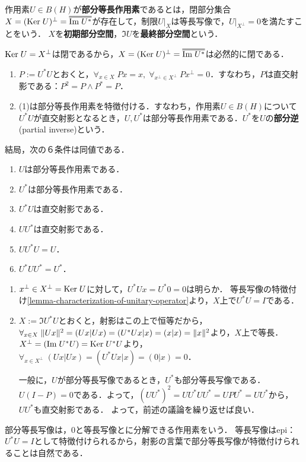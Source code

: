 \documentclass[uplatex,dvipdfmx]{jsreport}
\begin{document}
\begin{definition}
    作用素$U\in B(H)$が\textbf{部分等長作用素}であるとは，閉部分集合$X=(\Ker U)^\perp=\oo{\Im U^*}$が存在して，制限$U|_X$は等長写像で，$U|_{X^\perp}=0$を満たすことをいう．
    $X$を\textbf{初期部分空間}，$\Im U$を\textbf{最終部分空間}という．
\end{definition}
\begin{remarks}
    $\mathrm{Ker}\; U=X^\perp$は閉であるから，$X=(\Ker U)^\perp=\oo{\Im U^*}$は必然的に閉である．
\end{remarks}
\begin{lemma}[部分等長写像の特徴付け]\mbox{}
    \begin{enumerate}
        \item $P:=U^*U$とおくと，$\forall_{x\in X}\;Px=x,\;\forall_{x^\perp\in X^\perp}\;Px^\perp=0$．すなわち，$P$は直交射影である：$P^2=P\land P^*=P$．
        \item (1)は部分等長作用素を特徴付ける．すなわち，作用素$U\in B(H)$について$U^*U$が直交射影となるとき，$U,U^*$は部分等長作用素である．$U^*$を$U$の\textbf{部分逆}(partial inverse)という．
    \end{enumerate}
    結局，次の６条件は同値である．
    \begin{enumerate}
        \item $U$は部分等長作用素である．
        \item $U^*$は部分等長作用素である．
        \item $U^*U$は直交射影である．
        \item $UU^*$は直交射影である．
        \item $UU^*U=U$．
        \item $U^*UU^*=U^*$．
    \end{enumerate}
\end{lemma}
\begin{Proof}\mbox{}
    \begin{enumerate}
        \item $x^\perp\in X^\perp=\mathrm{Ker}\; U$に対して，$U^*Ux=U^*0=0$は明らか．
        等長写像の特徴付け\ref{lemma-characterization-of-unitary-operator}より，$X$上で$U^*U=I$である．
        \item $X:=\Im U^*U$とおくと，射影はこの上で恒等だから，$\forall_{x\in X}\;\|Ux\|^2=(Ux|Ux)=(U^*Ux|x)=(x|x)=\|x\|^2$より，$X$上で等長．$X^\perp=(\mathrm{Im}\; U^*U)=\mathrm{Ker}\; U^*U$より，$\forall_{x\in X^\perp}\;(Ux|Ux)=(U^*Ux|x)=(0|x)=0$．
        
        一般に，$U$が部分等長写像であるとき，$U^*$も部分等長写像である．
        $U(I-P)=0$である．よって，$(UU^*)^2=UU^*UU^*=UPU^*=UU^*$から，$UU^*$も直交射影である．
        よって，前述の議論を繰り返せば良い．
    \end{enumerate}
\end{Proof}
\begin{remarks}
    部分等長写像は，$0$と等長写像とに分解できる作用素をいう．
    等長写像はepi：$U^*U=I$として特徴付けられるから，射影の言葉で部分等長写像が特徴付けられることは自然である．
\end{remarks}
\end{document}
